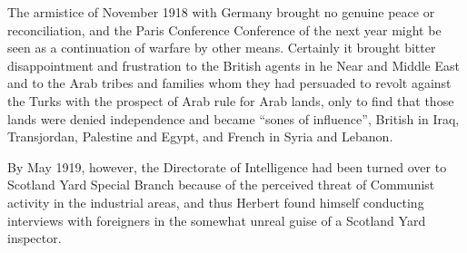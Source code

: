 The armistice of November 1918 with Germany brought no genuine peace or reconciliation, and the Paris Conference Conference of the next year might be seen as a continuation of warfare by other means. Certainly it brought bitter disappointment and frustration to the British agents in he Near and Middle East and to the Arab tribes and families whom they had persuaded to revolt against the Turks with the prospect of Arab rule for Arab lands, only to find that those lands were denied independence and became “sones of influence”, British in Iraq, Transjordan, Palestine and Egypt, and French in Syria and Lebanon. 

By May 1919, however, the Directorate of Intelligence had been turned over to Scotland Yard Special Branch because of the perceived threat of Communist activity in the industrial areas, and thus Herbert found himself conducting interviews with foreigners in the somewhat unreal guise of a Scotland Yard inspector.

